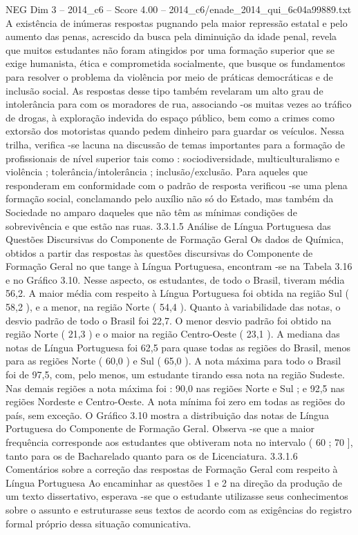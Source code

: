 \begin{textsample}{NEG Dim 3 – 2014\_c6 – Score 4.00 – 2014\_c6/enade\_2014\_qui\_6c04a99889.txt}
A existência de inúmeras respostas pugnando pela maior repressão estatal e pelo aumento das penas, acrescido da busca pela diminuição da idade penal, revela que muitos estudantes não foram atingidos por uma formação superior que se exige humanista, ética e comprometida socialmente, que busque os fundamentos para resolver o problema da violência por meio de práticas democráticas e de inclusão social.
As respostas desse tipo também revelaram um alto grau de intolerância para com os moradores de rua, associando -os muitas vezes ao tráfico de drogas, à exploração indevida do espaço público, bem como a crimes como extorsão dos motoristas quando pedem dinheiro para guardar os veículos.
Nessa trilha, verifica -se lacuna na discussão de temas importantes para a formação de profissionais de nível superior tais como : sociodiversidade, multiculturalismo e violência ; tolerância/intolerância ; inclusão/exclusão.
Para aqueles que responderam em conformidade com o padrão de resposta verificou -se uma plena formação social, conclamando pelo auxílio não só do Estado, mas também da Sociedade no amparo daqueles que não têm as mínimas condições de sobrevivência e que estão nas ruas. 3.3.1.5 Análise de Língua Portuguesa das Questões Discursivas do Componente de Formação Geral Os dados de Química, obtidos a partir das respostas às questões discursivas do Componente de Formação Geral no que tange à Língua Portuguesa, encontram -se na Tabela 3.16 e no Gráfico 3.10.
Nesse aspecto, os estudantes, de todo o Brasil, tiveram média 56,2.
A maior média com respeito à Língua Portuguesa foi obtida na região Sul ( 58,2 ), e a menor, na região Norte ( 54,4 ).
Quanto à variabilidade das notas, o desvio padrão de todo o Brasil foi 22,7.
O menor desvio padrão foi obtido na região Norte ( 21,3 ) e o maior na região Centro-Oeste ( 23,1 ).
A mediana das notas de Língua Portuguesa foi 62,5 para quase todas as regiões do Brasil, menos para as regiões Norte ( 60,0 ) e Sul ( 65,0 ).
A nota máxima para todo o Brasil foi de 97,5, com, pelo menos, um estudante tirando essa nota na região Sudeste.
Nas demais regiões a nota máxima foi : 90,0 nas regiões Norte e Sul ; e 92,5 nas regiões Nordeste e Centro-Oeste.
A nota mínima foi zero em todas as regiões do país, sem exceção.
O Gráfico 3.10 mostra a distribuição das notas de Língua Portuguesa do Componente de Formação Geral.
Observa -se que a maior frequência corresponde aos estudantes que obtiveram nota no intervalo ( 60 ; 70 ], tanto para os de Bacharelado quanto para os de Licenciatura. 3.3.1.6 Comentários sobre a correção das respostas de Formação Geral com respeito à Língua Portuguesa Ao encaminhar as questões 1 e 2 na direção da produção de um texto dissertativo, esperava -se que o estudante utilizasse seus conhecimentos sobre o assunto e estruturasse seus textos de acordo com as exigências do registro formal próprio dessa situação comunicativa.

\end{textsample}
